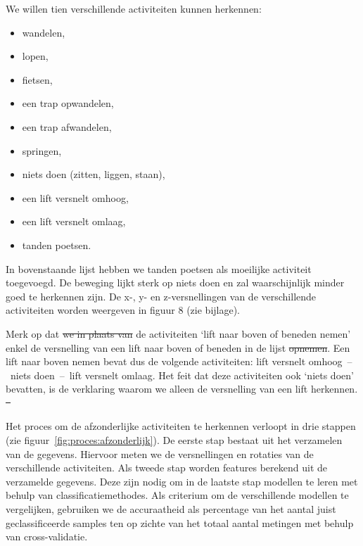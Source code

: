 \documentclass{article}
\providecommand{\DIFadd}[1]{{\protect\color{blue}\uwave{#1}}} %
\providecommand{\DIFdel}[1]{{\protect\color{red}\sout{#1}}}                      %
\providecommand{\DIFaddbegin}{} %
\providecommand{\DIFaddend}{} %
\providecommand{\DIFdelbegin}{} %
\providecommand{\DIFdelend}{} %
\begin{document}
We willen tien verschillende activiteiten kunnen herkennen:
\begin{itemize}
\item wandelen,
\item lopen,
\item fietsen,
\item een trap opwandelen,
\item een trap afwandelen,
\item springen,
\item niets doen (zitten, liggen, staan),
\item een lift versnelt omhoog,
\item een lift versnelt omlaag,
\item tanden poetsen.
\end{itemize}

In bovenstaande lijst hebben we tanden poetsen als moeilijke activiteit toegevoegd. De beweging lijkt sterk op niets doen en zal waarschijnlijk minder goed te herkennen zijn. De x-, y- en z-versnellingen van de verschillende activiteiten worden weergeven in figuur 8 (zie bijlage).

Merk op dat \DIFdelbegin \DIFdel{we in plaats van }\DIFdelend \DIFaddbegin \DIFadd{voor }\DIFaddend de activiteiten `lift naar boven of beneden nemen' enkel de versnelling van een lift naar boven of beneden in de lijst \DIFdelbegin \DIFdel{opnemen}\DIFdelend \DIFaddbegin \DIFadd{wordt opgenomen}\DIFaddend . Een lift naar boven nemen bevat dus de volgende activiteiten: lift versnelt omhoog~--~niets doen~--~lift versnelt omlaag. Het feit dat deze activiteiten ook `niets doen' bevatten, is de verklaring waarom we alleen de versnelling van een lift herkennen.
\DIFdelbegin %
\DIFdel{~}%
\DIFdelend \DIFaddbegin 

\DIFaddend Het proces om de afzonderlijke activiteiten te herkennen verloopt in drie stappen (zie figuur~\ref{fig:proces:afzonderlijk}). De eerste stap bestaat uit het verzamelen van de gegevens. Hiervoor meten we de versnellingen en rotaties van de verschillende activiteiten. Als tweede stap worden features berekend uit de verzamelde gegevens. Deze zijn nodig om in de laatste stap modellen te leren met behulp van classificatiemethodes. Als criterium om de verschillende modellen te vergelijken, gebruiken we de accuraatheid als percentage van het aantal juist geclassificeerde samples ten op zichte van het totaal aantal metingen met behulp van cross-validatie.
\end{document}
